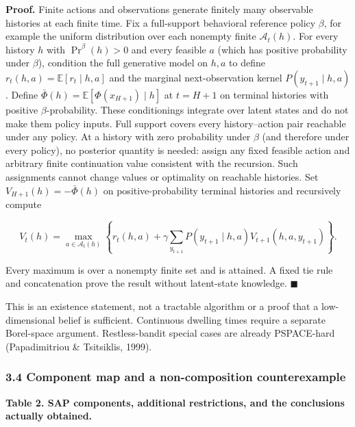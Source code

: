 \documentclass[
  11pt]{article}
\begin{document}
\textbf{Proof.} Finite actions and observations generate finitely many
observable histories at each finite time. Fix a full-support behavioral
reference policy \(\beta\), for example the uniform distribution over
each nonempty finite \(\mathcal A_t(h)\). For every history \(h\) with
\(\Pr^\beta(h)>0\) and every feasible \(a\) (which has positive
probability under \(\beta\)), condition the full generative model on
\(h,a\) to define \(r_t(h,a)=\mathbb E[r_t\mid h,a]\) and the marginal
next-observation kernel \(P(y_{t+1}\mid h,a)\). Define
\(\bar\Phi(h)=\mathbb E[\Phi(x_{H+1})\mid h]\) at \(t=H+1\) on terminal
histories with positive \(\beta\)-probability. These conditionings
integrate over latent states and do not make them policy inputs. Full
support covers every history--action pair reachable under any policy. At
a history with zero probability under \(\beta\) (and therefore under
every policy), no posterior quantity is needed: assign any fixed
feasible action and arbitrary finite continuation value consistent with
the recursion. Such assignments cannot change values or optimality on
reachable histories. Set \(V_{H+1}(h)=-\bar\Phi(h)\) on
positive-probability terminal histories and recursively compute

\[V_t(h)=\max_{a\in\mathcal A_t(h)}\left\{r_t(h,a)+\gamma\sum_{y_{t+1}}P(y_{t+1}\mid h,a)V_{t+1}(h,a,y_{t+1})\right\}.\]

Every maximum is over a nonempty finite set and is attained. A fixed tie
rule and concatenation prove the result without latent-state knowledge.
\(\blacksquare\)

This is an existence statement, not a tractable algorithm or a proof
that a low-dimensional belief is sufficient. Continuous dwelling times
require a separate Borel-space argument. Restless-bandit special cases
are already PSPACE-hard (Papadimitriou \& Tsitsiklis, 1999).

\subsubsection{3.4 Component map and a non-composition
counterexample}\label{component-map-and-a-non-composition-counterexample}

\textbf{Table 2. SAP components, additional restrictions, and the
conclusions actually obtained.}
\end{document}
